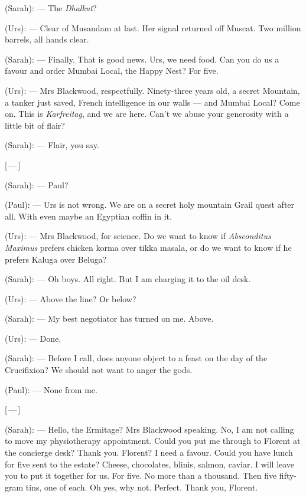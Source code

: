 
\begin{room}

(Sarah): --- The \textit{Dhalkut}?

(Urs): --- Clear of Musandam at last. Her signal returned off Muscat. Two million barrels, all hands clear.

(Sarah): --- Finally. That is good news. Urs, we need food. Can you do us a favour and order Mumbai Local, the Happy Nest? For five.

(Urs): --- Mrs Blackwood, respectfully. Ninety-three years old, a secret Mountain, a tanker just saved, French intelligence in our walls --- and Mumbai Local? Come on. This is \textit{Karfreitag}, and we are here. Can't we abuse your generosity with a little bit of flair?

(Sarah): --- Flair, you say.

\centerline{[\,---\,]}

(Sarah): --- Paul?

(Paul): --- Urs is not wrong. We are on a secret holy mountain Grail quest after all. With even maybe an Egyptian coffin in it.

(Urs): --- Mrs Blackwood, for science. Do we want to know if \textit{Absconditus Maximus} prefers chicken korma over tikka masala, or do we want to know if he prefers Kaluga over Beluga?

(Sarah): --- Oh boys. All right. But I am charging it to the oil desk.

(Urs): --- Above the line? Or below?

(Sarah): --- My best negotiator has turned on me. Above.

(Urs): --- Done.

(Sarah): --- Before I call, does anyone object to a feast on the day of the Crucifixion? We should not want to anger the gods.

(Paul): --- None from me.

\centerline{[\,---\,]}

(Sarah): --- Hello, the Ermitage? Mrs Blackwood speaking. No, I am not calling to move my physiotherapy appointment. Could you put me through to Florent at the concierge desk? Thank you. Florent? I need a favour. Could you have lunch for five sent to the estate? Cheese, chocolates, blinis, salmon, caviar. I will leave you to put it together for us. For five. No more than a thousand. Then five fifty-gram tins, one of each. Oh yes, why not. Perfect. Thank you, Florent.


\end{room}
